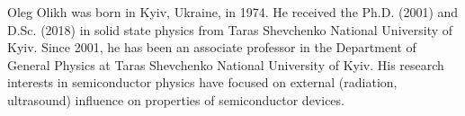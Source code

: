 \documentclass[journal]{IEEEtran}
\begin{document}



\begin{IEEEbiography}{Oleg Olikh}
 was born in Kyiv, Ukraine, in 1974.
 He received the Ph.D. (2001) and D.Sc. (2018) in solid state physics from Taras Shevchenko National University of Kyiv.
 Since 2001, he has been an associate professor in the Department of General Physics at Taras Shevchenko National University of Kyiv.
 His research interests in semiconductor physics have focused on external (radiation, ultrasound) influence on properties of semiconductor devices.
\end{IEEEbiography}






\end{document}
